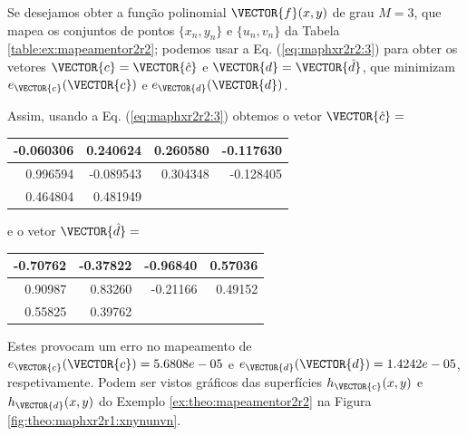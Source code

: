 \begin{minipage}{0.6\textwidth}
\begin{SolutionT}\label{sol:theo:mapeamentor2r2}
Se desejamos obter a função polinomial $\VECTOR{f}(x,y)$ de grau $M=3$,
que mapea os conjuntos de pontos $\{x_n,y_n\}$ e $\{u_n,v_n\}$ da Tabela \ref{table:ex:mapeamentor2r2}; 
podemos usar a Eq. (\ref{eq:maphxr2r2:3}) 
para obter os vetores $\VECTOR{c}=\VECTOR{\hat{c}}$ e $\VECTOR{d}=\VECTOR{\hat{d}}$,
que minimizam $e_{\VECTOR{c}}(\VECTOR{c})$ e $e_{\VECTOR{d}}(\VECTOR{d})$.


Assim, usando a Eq. (\ref{eq:maphxr2r2:3}) obtemos o vetor $\VECTOR{\hat{c}}=$ 
\begin{center}
\begin{tabular}{ r r r r }
  \hline
  -0.060306 &   0.240624 &   0.260580 &  -0.117630 \\ \hline
   0.996594 &  -0.089543 &   0.304348 &  -0.128405 \\ \hline
   0.464804 &   0.481949 & ~ & ~ \\ \hline
\end{tabular}
\end{center}

e o vetor $\VECTOR{\hat{d}}=$ 
\begin{center}
\begin{tabular}{ r r r r }
\hline
  -0.70762 &  -0.37822 &  -0.96840 &   0.57036 \\ \hline
   0.90987 &   0.83260 &  -0.21166 &   0.49152  \\ \hline
   0.55825 &   0.39762 & ~ & ~ \\ \hline
\end{tabular}
\end{center}
Estes provocam um erro no mapeamento 
de $e_{\VECTOR{c}}(\VECTOR{c})=5.6808e-05$ e $e_{\VECTOR{d}}(\VECTOR{d})=1.4242e-05$, respetivamente.
Podem ser vistos gráficos das superfícies $h_{\VECTOR{c}}(x,y)$ e $h_{\VECTOR{d}}(x,y)$ 
do Exemplo \ref{ex:theo:mapeamentor2r2} na Figura \ref{fig:theo:maphxr2r1:xnynunvn}.
\end{SolutionT}
\end{minipage}

